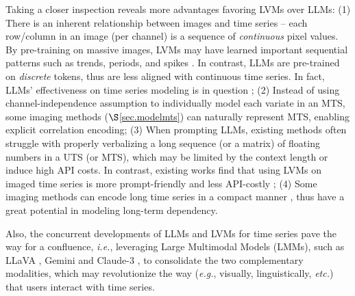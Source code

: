 Taking a closer inspection reveals more advantages favoring LVMs over LLMs: (1) There is an inherent relationship between images and time series -- each row/column in an image (per channel) is a sequence of {\em continuous} pixel values. By pre-training on massive images, LVMs may have learned important sequential patterns such as trends, periods, and spikes \cite{chen2024visionts}. In contrast, LLMs are pre-trained on {\em discrete} tokens, thus are less aligned with continuous time series. In fact, LLMs' effectiveness on time series modeling is in question \cite{tan2024language}; (2) Instead of using channel-independence assumption \cite{nie2023time} to individually model each variate in an MTS, some imaging methods ($\S$\ref{sec.modelmts}) can naturally represent MTS, enabling explicit correlation encoding; (3) When prompting LLMs, existing methods often struggle with properly %
verbalizing a long sequence (or a matrix) of floating numbers in a UTS (or MTS), which may be limited by the context length or induce high API costs. In contrast, existing works find that using LVMs on imaged time series is more prompt-friendly and less API-costly \cite{daswani2024plots}; (4) Some imaging methods %
can encode long time series in a compact manner \cite{naiman2024utilizing}, thus have a great potential in modeling long-term dependency.


Also, the concurrent developments of LLMs and LVMs for time series %
pave the way for a confluence, 
{\em i.e.}, leveraging %
Large Multimodal Models (LMMs), %
such as LLaVA \cite{liu2023visual}, Gemini \cite{team2023gemini} %
and Claude-3 \cite{anthropic2024claude}, to consolidate the two complementary modalities, which may %
revolutionize the way ({\em e.g.}, visually, linguistically, {\em etc.}) that users interact with time series.


